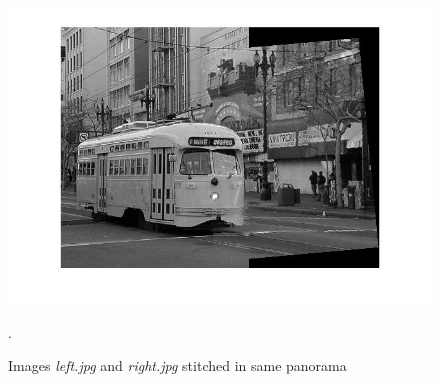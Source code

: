 \documentclass[11pt]{article}
\begin{document}
\begin{figure}[htpb]
	\centering
	\includegraphics[width=1\textwidth]{imgs/stitched.jpg}
	\caption{Images \textit{left.jpg} and \textit{right.jpg} stitched in same panorama}.
	\label{fig:stitched}
\end{figure}
\end{document}
